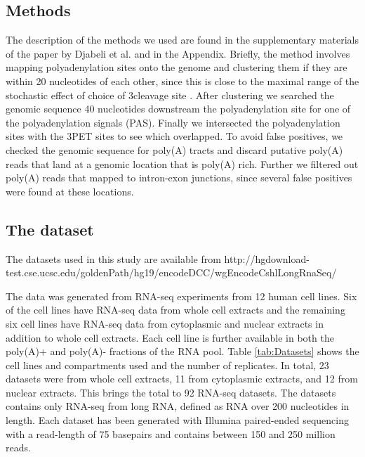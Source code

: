 \subsection{Methods}
The description of the methods we used are found in the supplementary materials
of the paper by Djabeli et al. and in the Appendix. Briefly, the method
involves mapping polyadenylation sites onto the genome and clustering them if
they are within 20 nucleotides of each other, since this is close to the
maximal range of the stochastic effect of choice of 3\p cleavage site
\cite{tian_large-scale_2005}. After clustering we searched the genomic sequence
40 nucleotides downstream the polyadenylation site for one of the
polyadenylation signals (PAS). Finally we intersected the polyadenylation sites
with the 3\p PET sites to see which overlapped. To avoid false positives, we
checked the genomic sequence for poly(A) tracts and discard putative poly(A)
reads that land at a genomic location that is poly(A) rich. Further we filtered
out poly(A) reads that mapped to intron-exon junctions, since several false
positives were found at these locations.

\subsection{The dataset}
The datasets used in this study are available from
http://hgdownload-test.cse.ucsc.edu/goldenPath/hg19/encodeDCC/wgEncodeCshlLongRnaSeq/

The data was generated from RNA-seq experiments from 12 human cell lines. Six
of the cell lines have RNA-seq data from whole cell extracts and the remaining
six cell lines have RNA-seq data from cytoplasmic and nuclear extracts in
addition to whole cell extracts. Each cell line is further available in both
the poly(A)+ and poly(A)- fractions of the RNA pool. Table \ref{tab:Datasets}
shows the cell lines and compartments used and the number of replicates. In
total, 23 datasets were from whole cell extracts, 11 from cytoplasmic extracts,
and 12 from nuclear extracts. This brings the total to 92 RNA-seq datasets. The
datasets contains only RNA-seq from long RNA, defined as RNA over 200
nucleotides in length. Each dataset has been generated with Illumina
paired-ended sequencing with a read-length of 75 basepairs and contains between
150 and 250 million reads.

